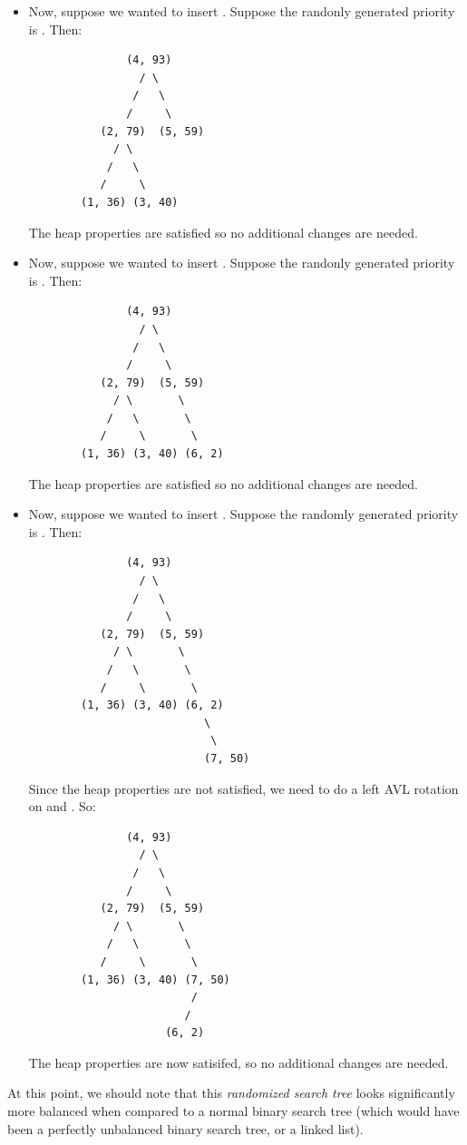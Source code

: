 \documentclass[letterpaper]{article}
\begin{document}
\begin{itemize}
    \item Now, suppose we wanted to insert . Suppose the randonly generated priority is . Then: 
    \begin{verbatim}
               (4, 93)
                 / \ 
                /   \ 
               /     \ 
           (2, 79)  (5, 59)
             / \ 
            /   \ 
           /     \ 
        (1, 36) (3, 40)   
    \end{verbatim}
    The heap properties are satisfied so no additional changes are needed. 

    \item Now, suppose we wanted to insert . Suppose the randonly generated priority is . Then: 
    \begin{verbatim}
               (4, 93)
                 / \ 
                /   \ 
               /     \ 
           (2, 79)  (5, 59)
             / \       \ 
            /   \       \ 
           /     \       \ 
        (1, 36) (3, 40) (6, 2)
    \end{verbatim}
    The heap properties are satisfied so no additional changes are needed.

    \item Now, suppose we wanted to insert . Suppose the randomly generated priority is . Then:  
    \begin{verbatim}
               (4, 93)
                 / \ 
                /   \ 
               /     \ 
           (2, 79)  (5, 59)
             / \       \ 
            /   \       \ 
           /     \       \ 
        (1, 36) (3, 40) (6, 2)
                           \ 
                            \
                           (7, 50)
    \end{verbatim}
    Since the heap properties are not satisfied, we need to do a left AVL rotation on  and . So: 
    \begin{verbatim}
               (4, 93)
                 / \ 
                /   \ 
               /     \ 
           (2, 79)  (5, 59)
             / \       \ 
            /   \       \ 
           /     \       \ 
        (1, 36) (3, 40) (7, 50)
                         / 
                        /  
                     (6, 2)
    \end{verbatim}
    The heap properties are now satisifed, so no additional changes are needed. 
\end{itemize}

At this point, we should note that this \emph{randomized search tree} looks significantly more balanced when compared to a normal binary search tree (which would have been a perfectly unbalanced binary search tree, or a linked list). 
\end{document}

